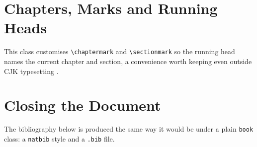 \documentclass[12pt,oneside]{book}
\begin{document}
\section{Chapters, Marks and Running Heads}

This class customises \verb|\chaptermark| and \verb|\sectionmark| so the
running head names the current chapter and section, a convenience worth
keeping even outside CJK typesetting \citep{knuth1984texbook}.

\section{Closing the Document}

The bibliography below is produced the same way it would be under a plain
\texttt{book} class: a \texttt{natbib} style and a \texttt{.bib} file.



\end{document}
